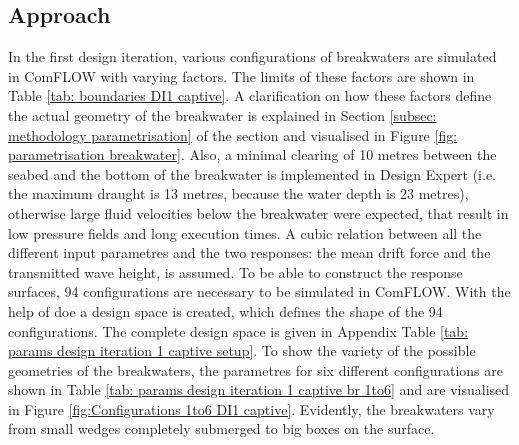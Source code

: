 \subsection{Approach}
\label{sec: DI1 captive H3 approach}

In the first design iteration, various configurations of breakwaters are simulated in ComFLOW with varying factors. The limits of these factors are shown in Table \ref{tab: boundaries DI1 captive}. A clarification on how these factors define the actual geometry of the breakwater is explained in Section \ref{subsec: methodology parametrisation} of the  section and visualised in Figure \ref{fig: parametrisation breakwater}. Also, a minimal clearing of 10 metres between the seabed and the bottom of the breakwater is implemented in Design Expert (i.e. the maximum draught is 13 metres, because the water depth is 23 metres), otherwise large fluid velocities below the breakwater were expected, that result in low pressure fields and long execution times. A cubic relation between all the different input parametres and the two responses: the mean drift force and the transmitted wave height, is assumed. To be able to construct the response surfaces, 94 configurations are necessary to be simulated in ComFLOW. With the help of \acrfull{doe} a design space is created, which defines the shape of the 94 configurations. The complete design space is given in Appendix Table \ref{tab: params design iteration 1 captive setup}. To show the variety of the possible geometries of the breakwaters, the parametres for six different configurations are shown in Table \ref{tab: params design iteration 1 captive br 1to6} and are visualised in Figure  \ref{fig:Configurations 1to6 DI1 captive}. Evidently, the breakwaters vary from small wedges completely submerged to big boxes on the surface. 

\begin{table}[h]
\centering
{}
\caption{Boundaries Design Space Captive Design Iteration 1}
\label{tab: boundaries DI1 captive}
\end{table}

